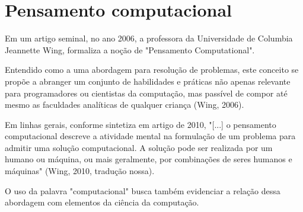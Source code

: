 \documentclass{book}
\begin{document}
\chapter{Pensamento computacional}


Em um artigo seminal, no ano 2006,  a professora da Universidade de Columbia 
Jeannette Wing, formaliza a noção de "Pensamento Computational". 

Entendido como a uma abordagem para resolução de problemas, este conceito
se propõe a abranger um conjunto de habilidades e práticas não apenas relevante para programadores ou cientistas da computação, mas passível de compor até mesmo as
faculdades analíticas de qualquer criança (Wing, 2006).

Em linhas gerais, conforme sintetiza em artigo de 2010, "[...] o pensamento 
computacional descreve a atividade mental na formulação de um problema para admitir 
uma solução computacional. A solução pode ser realizada por um humano ou máquina, 
ou mais geralmente, por combinações de seres humanos e máquinas" (Wing, 2010, tradução nossa).

O uso da palavra "computacional" busca também evidenciar a relação dessa abordagem 
com elementos da ciência da computação.
\end{document}
